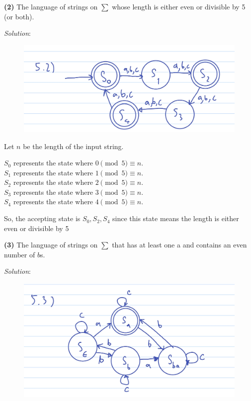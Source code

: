 \documentclass[a4paper, 11pt]{article}
\renewcommand{\part}[1] {\vspace{.10in} {\bf (#1)}}
\begin{document}
	\part{2} The language of strings on $\sum$ whose length is either even or divisible by 5 (or both).
	
	{\em Solution}:
	
	\begin{figure}[htbp]
		\centering
		\includegraphics[width=\linewidth]{figures/2.jpg}
	\end{figure}
	Let $n$ be the length of the input string.
	
	$S_0$ represents the state where $0 \pmod{5} \equiv n$.\\
	$S_1$ represents the state where $1 \pmod{5} \equiv n$.\\
	$S_2$ represents the state where $2 \pmod{5} \equiv n$.\\
	$S_3$ represents the state where $3 \pmod{5} \equiv n$.\\
	$S_4$ represents the state where $4 \pmod{5} \equiv n$.
	
	So, the accepting state is $S_0, S_2, S_4$ since this state means the length is either even or divisible by 5
	
	\part{3} The language of strings on $\sum$ that has at least one a and contains an even number of $b$s.
	
	{\em Solution}:
	\begin{figure}[htbp]
		\centering
		\includegraphics[width=\linewidth]{figures/3.jpg}
	\end{figure}
\end{document}
